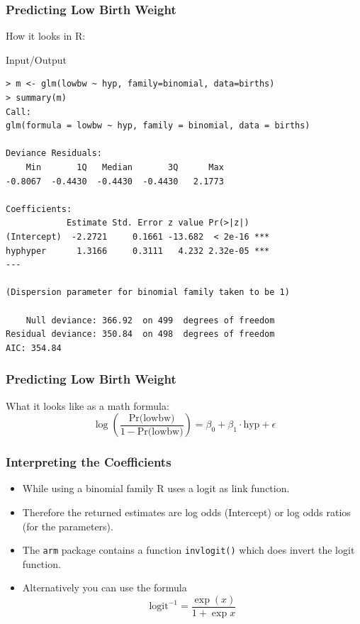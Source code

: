\begin{frame}[fragile]\frametitle{Predicting Low Birth Weight}\footnotesize
How it looks in R:
\begin{exampleblock}{Input/Output}\scriptsize
\begin{verbatim}
> m <- glm(lowbw ~ hyp, family=binomial, data=births)
> summary(m)
Call:
glm(formula = lowbw ~ hyp, family = binomial, data = births)

Deviance Residuals: 
    Min       1Q   Median       3Q      Max  
-0.8067  -0.4430  -0.4430  -0.4430   2.1773  

Coefficients:
            Estimate Std. Error z value Pr(>|z|)    
(Intercept)  -2.2721     0.1661 -13.682  < 2e-16 ***
hyphyper      1.3166     0.3111   4.232 2.32e-05 ***
---

(Dispersion parameter for binomial family taken to be 1)

    Null deviance: 366.92  on 499  degrees of freedom
Residual deviance: 350.84  on 498  degrees of freedom
AIC: 354.84

\end{verbatim}
\end{exampleblock}
\end{frame}


\begin{frame}[fragile]\frametitle{Predicting Low Birth Weight}\footnotesize
What it looks like as a math formula:
$$ \log\left(\frac{\mbox{Pr(lowbw)}}{1-\mbox{Pr(lowbw)}}\right) = \beta_0 + \beta_1 \cdot \mbox{hyp} + \epsilon$$
\end{frame}


\begin{frame}[fragile]\frametitle{Interpreting the Coefficients}
\begin{itemize}
\item While using a binomial family R uses a logit as link function.
\item Therefore the returned estimates are log odds (Intercept) or log odds ratios (for the parameters). 
\item The \texttt{arm} package contains a function \texttt{invlogit()} which does invert the logit function. 
\item Alternatively you can use the formula $$ \mbox{logit}^{-1}= \frac{\exp(x)}{1+\exp{x}} $$
\end{itemize}
\end{frame}




